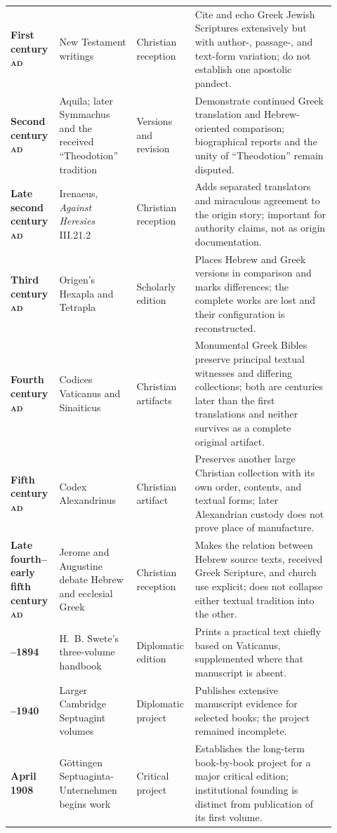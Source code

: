 \begin{longtable}{>{\bfseries\RaggedRight\arraybackslash}p{0.14\linewidth}>{\RaggedRight\arraybackslash}p{0.23\linewidth}>{\RaggedRight\arraybackslash}p{0.13\linewidth}>{\RaggedRight\arraybackslash}p{0.42\linewidth}}
First century \textnormal{\textsc{ad}} & New Testament writings & Christian reception & Cite and echo Greek Jewish Scriptures extensively but with author-, passage-, and text-form variation; do not establish one apostolic pandect.\\
Second century \textnormal{\textsc{ad}} & Aquila; later Symmachus and the received “Theodotion” tradition & Versions and revision & Demonstrate continued Greek translation and Hebrew-oriented comparison; biographical reports and the unity of “Theodotion” remain disputed.\\
Late second century \textnormal{\textsc{ad}} & Irenaeus, \emph{Against Heresies} III.21.2 & Christian reception & Adds separated translators and miraculous agreement to the origin story; important for authority claims, not as origin documentation.\\
Third century \textnormal{\textsc{ad}} & Origen's Hexapla and Tetrapla & Scholarly edition & Places Hebrew and Greek versions in comparison and marks differences; the complete works are lost and their configuration is reconstructed.\\
Fourth century \textnormal{\textsc{ad}} & Codices Vaticanus and Sinaiticus & Christian artifacts & Monumental Greek Bibles preserve principal textual witnesses and differing collections; both are centuries later than the first translations and neither survives as a complete original artifact.\\
Fifth century \textnormal{\textsc{ad}} & Codex Alexandrinus & Christian artifact & Preserves another large Christian collection with its own order, contents, and textual forms; later Alexandrian custody does not prove place of manufacture.\\
Late fourth--early fifth century \textnormal{\textsc{ad}} & Jerome and Augustine debate Hebrew and ecclesial Greek & Christian reception & Makes the relation between Hebrew source texts, received Greek Scripture, and church use explicit; does not collapse either textual tradition into the other.\\
1887--1894 & H.~B. Swete's three-volume handbook & Diplomatic edition & Prints a practical text chiefly based on Vaticanus, supplemented where that manuscript is absent.\\
1906--1940 & Larger Cambridge Septuagint volumes & Diplomatic project & Publishes extensive manuscript evidence for selected books; the project remained incomplete.\\
1 April 1908 & G\"ottingen Septuaginta-Unternehmen begins work & Critical project & Establishes the long-term book-by-book project for a major critical edition; institutional founding is distinct from publication of its first volume.\\

\end{longtable}
